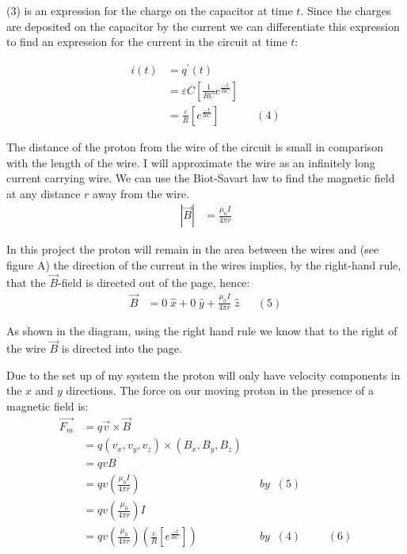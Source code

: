 \documentclass[11pt]{article}
\begin{document}
\vspace{.2in}
\noindent (3) is an expression for the charge on the capacitor at time $t$. Since the charges are deposited on the capacitor by the current we can differentiate this expression to find an expression for the current in the circuit at time $t$: 

\begin{align*}
i(t)&=q^{'}(t)\\&=\varepsilon C\left[\frac{1}{RC}e^{\frac{-t}{RC}}\right]\\&=\frac{\varepsilon}{R}\left[e^{\frac{-t}{RC}}\right]&&(4)
\end{align*}

\vspace{.2in}

\noindent The distance of the proton from the wire of the circuit is small in comparison with the length of the wire. I will approximate the wire as an infinitely long current carrying wire. We can use the Biot-Savart law to find the magnetic field at any distance $r$ away from the wire. 
\begin{align*}
\left|\vec{B}\right|&=\frac{\mu_0I}{4\pi r}
\end{align*}

\vspace{.2in}

\noindent In this project the proton will remain in the area between the wires and (see figure A) the direction of the current in the wires implies, by the right-hand rule, that the $\vec{B}$-field is directed out of the page, hence:
\begin{align*}
\vec{B}&=0\;\hat{x}+0\;\hat{y}+\frac{\mu_0I}{4\pi r}\;\hat{z}&&(5)
\end{align*}


\vspace{.1in}

\noindent As shown in the diagram, using the right hand rule we know that to the right of the wire $\vec{B}$ is directed into the page. 

\vspace{.2in}

\noindent Due to the set up of my system the proton will only have velocity components in the $x$ and $y$ directions. The force on our moving proton in the presence of a magnetic field is:
\begin{align*}
\vec{F_m}&=q\vec{v}\times\vec{B}\\&=q(v_x,v_y,v_z)\times (B_x,B_y,B_z)\\&=qvB\\&=qv\left(\frac{\mu_0I}{4\pi r}\right)&&by\;\;(5)\\&=qv\left(\frac{\mu_0}{4\pi r}\right)I\\&=qv\left(\frac{\mu_0}{4\pi r}\right)\left(\frac{\varepsilon}{R}\left[e^{\frac{-t}{RC}}\right]\right)&&by\;\;(4)&&&(6)
\end{align*}
\end{document}
